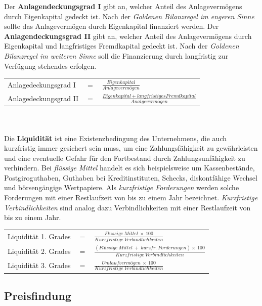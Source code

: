 Der {\bf Anlagendeckungsgrad I} gibt an, welcher Anteil des Anlagevermögens durch Eigenkapital gedeckt ist. Nach der {\it Goldenen Bilanzregel im engeren Sinne} sollte das Anlagevermögen durch Eigenkapital finanziert werden. Der {\bf Anlagendeckungsgrad II} gibt an, welcher Anteil des Anlagevermögens durch Eigenkapital und langfristiges Fremdkapital gedeckt ist. Nach der {\it Goldenen Bilanzregel im weiteren Sinne} soll die Finanzierung durch langfristig zur Verfügung stehendes erfolgen.\\

\begin{tabular}{lll}
Anlagedeckungsgrad I & $=$ & $\frac{Eigenkapital}{Anlagevermögen}$\\
Anlagedeckungsgrad II & $=$ & $\frac{Eigenkapital + langfristiges Fremdkapital}{Analgevermögen}$\\
\end{tabular}\\\\

Die {\bf Liquidität} ist eine Existenzbedingung des Unternehmens, die auch kurzfristig immer gesichert sein muss, um eine Zahlungsfähigkeit zu gewährleisten und eine eventuelle Gefahr für den Fortbestand durch Zahlungsunfähigkeit zu verhindern. Bei {\it flüssige Mittel} handelt es sich beispielsweise um Kassenbestände, Postgiroguthaben, Guthaben bei Kreditinstituten, Schecks, diskontfähige Wechsel und börsengängige Wertpapiere. 
Als {\it kurzfristige Forderungen} werden solche Forderungen mit einer Restlaufzeit von bis zu einem Jahr bezeichnet. {\it Kurzfristige Verbindlichkeiten} sind analog dazu Verbindlichkeiten mit einer Restlaufzeit von bis zu einem Jahr.\\

\begin{tabular}{lll}
Liquidität 1. Grades & $=$ & $\frac{Flüssige\ Mittel\ \times\ 100}{Kurzfristige\ Verbindlichkeiten}$\\
Liquidität 2. Grades & $=$ & $\frac{(Flüssige\ Mittel\ +\ kurzfr.\ Forderungen) \times\ 100}{Kurzfristige\ Verbindlichkeiten}$\\
Liquidität 3. Grades & $=$ & $\frac{Umlaufvermögen\ \times\ 100}{Kurzfristige\ Verbindlichkeiten}$
\end{tabular}


\subsection{Preisfindung}

